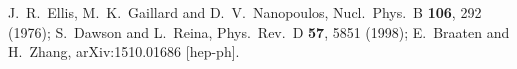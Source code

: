   J.~R.~Ellis, M.~K.~Gaillard and D.~V.~Nanopoulos,
  Nucl.\ Phys.\ B {\bf 106}, 292 (1976);
  S.~Dawson and L.~Reina,
  Phys.\ Rev.\ D {\bf 57}, 5851 (1998);
  E.~Braaten and H.~Zhang,
  arXiv:1510.01686 [hep-ph].

